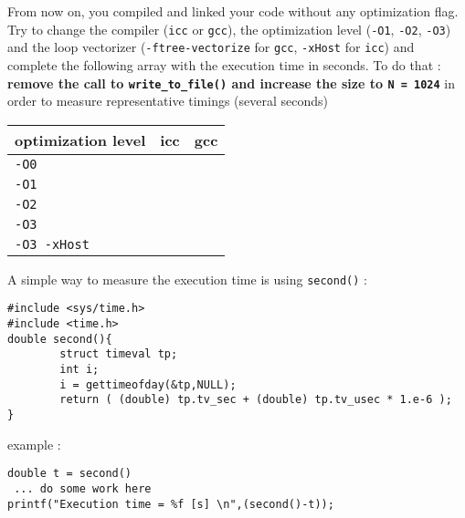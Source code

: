 \documentclass[11pt,a4paper]{article}
\begin{document}
\begin{exercise}

From now on, you compiled and linked your code without any optimization flag. Try to change the compiler ({\tt icc} or {\tt gcc}), the optimization level ({\tt -O1}, {\tt -O2}, {\tt -O3}) and the loop vectorizer ({\tt -ftree-vectorize} for {\tt gcc}, {\tt -xHost} for {\tt icc}) and complete the following array with the execution time in seconds. To do that : {\bf remove the call to {\tt write\_to\_file()} and increase the size to {\tt N = 1024} } in order to measure representative timings (several seconds)

\begin{center}
  \begin{tabular}{|l||l|l|}
    \hline
    optimization level & icc & gcc \\ \hline \hline
    {\tt -O0} &  &  \\ \hline
    {\tt -O1} &  &  \\ \hline
    {\tt -O2} &  &  \\ \hline
    {\tt -O3} &  &  \\ \hline
    {\tt -O3 -xHost} &  &  \\
    \hline
  \end{tabular}
\end{center}

A simple way to measure the execution time is using {\tt second()} :

\begin{verbatim}
#include <sys/time.h>
#include <time.h>
double second(){
        struct timeval tp;
        int i;
        i = gettimeofday(&tp,NULL);
        return ( (double) tp.tv_sec + (double) tp.tv_usec * 1.e-6 );
}
\end{verbatim}

example :

\begin{verbatim}
double t = second()
 ... do some work here
printf("Execution time = %f [s] \n",(second()-t));
\end{verbatim}

\end{exercise}


\end{document}
